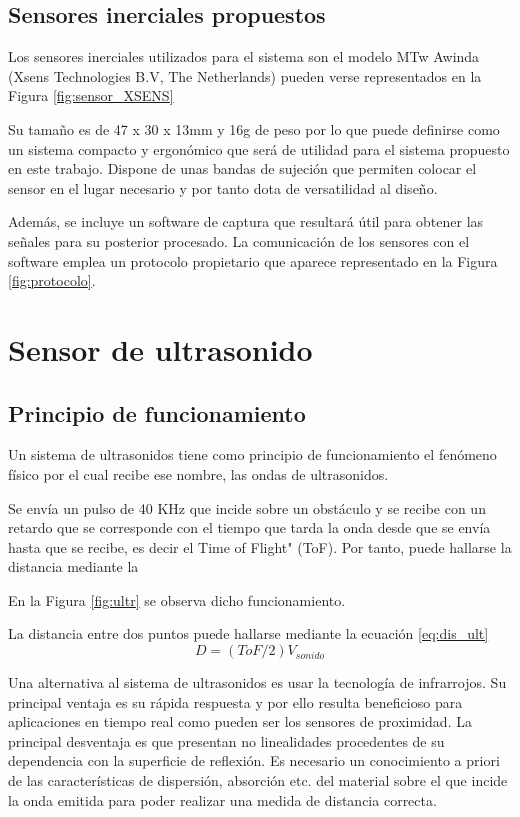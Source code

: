 \subsection{Sensores inerciales propuestos}
Los sensores inerciales utilizados para el sistema son el modelo MTw Awinda (Xsens Technologies B.V, The Netherlands) pueden verse representados en la Figura \ref{fig:sensor_XSENS}



Su tamaño es de 47 x 30 x 13mm y 16g de peso por lo que puede definirse como un sistema compacto y ergonómico que será de utilidad para el sistema propuesto en este trabajo. Dispone de unas bandas de sujeción que permiten colocar el sensor en el lugar necesario y por tanto dota de versatilidad al diseño. 

Además, se incluye un software de captura que resultará útil para obtener las señales para su posterior procesado. La comunicación de los sensores con el software emplea un protocolo propietario que aparece representado en la Figura \ref{fig:protocolo}.

	
\section{Sensor de ultrasonido}

\subsection{Principio de funcionamiento}
Un sistema de ultrasonidos tiene como principio de funcionamiento el fenómeno físico por el cual recibe ese nombre, las ondas de ultrasonidos.

Se envía un pulso de 40 KHz que incide sobre un obstáculo y se recibe con un retardo que se corresponde con el tiempo que tarda la onda desde que se envía hasta que se recibe, es decir el Time of Flight" (ToF). Por tanto, puede hallarse la distancia mediante la 

	 En la Figura \ref{fig:ultr} se observa dicho funcionamiento.

La distancia entre dos puntos puede hallarse mediante la ecuación \ref{eq:dis_ult}
	\begin{equation}\label{eq:dis_ult}
	D = (ToF/2)V_{sonido}
	\end{equation}
	
Una alternativa al sistema de ultrasonidos es usar la tecnología de infrarrojos. Su principal ventaja es su rápida respuesta y por ello resulta beneficioso para aplicaciones en tiempo real como pueden ser los sensores de proximidad. La principal desventaja es que presentan no linealidades procedentes de su dependencia con la superficie de reflexión. Es necesario un conocimiento a priori de las características de dispersión, absorción etc. del material sobre el que incide la onda emitida para poder realizar una medida de distancia correcta. 


